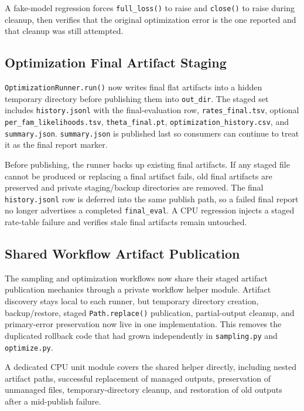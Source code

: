 \documentclass[11pt]{article}
\begin{document}
A fake-model regression forces \texttt{full\_loss()} to raise and
\texttt{close()} to raise during cleanup, then verifies that the original
optimization error is the one reported and that cleanup was still attempted.

\subsection{Optimization Final Artifact Staging}

\texttt{OptimizationRunner.run()} now writes final flat artifacts into a hidden
temporary directory before publishing them into \texttt{out\_dir}.  The staged
set includes \texttt{history.jsonl} with the final-evaluation row,
\texttt{rates\_final.tsv}, optional \texttt{per\_fam\_likelihoods.tsv},
\texttt{theta\_final.pt}, \texttt{optimization\_history.csv}, and
\texttt{summary.json}.  \texttt{summary.json} is published last so consumers can
continue to treat it as the final report marker.

Before publishing, the runner backs up existing final artifacts.  If any staged
file cannot be produced or replacing a final artifact fails, old final artifacts
are preserved and private staging/backup directories are removed.  The final
\texttt{history.jsonl} row is deferred into the same publish path, so a failed
final report no longer advertises a completed \texttt{final\_eval}.  A CPU
regression injects a staged rate-table failure and verifies stale final
artifacts remain untouched.

\subsection{Shared Workflow Artifact Publication}

The sampling and optimization workflows now share their staged artifact
publication mechanics through a private workflow helper module.  Artifact
discovery stays local to each runner, but temporary directory creation,
backup/restore, staged \texttt{Path.replace()} publication, partial-output
cleanup, and primary-error preservation now live in one implementation.  This
removes the duplicated rollback code that had grown independently in
\texttt{sampling.py} and \texttt{optimize.py}.

A dedicated CPU unit module covers the shared helper directly, including nested
artifact paths, successful replacement of managed outputs, preservation of
unmanaged files, temporary-directory cleanup, and restoration of old outputs
after a mid-publish failure.
\end{document}
